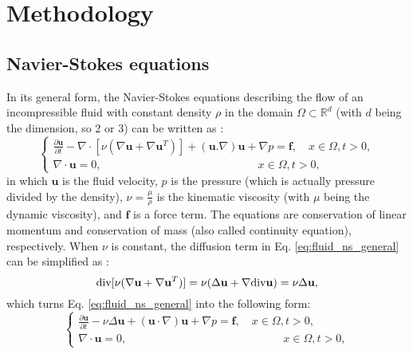 \section{Methodology}

\subsection{Navier-Stokes equations}

In its general form, the Navier-Stokes equations describing the flow of an incompressible fluid with constant density $\rho$ in the domain $\Omega \subset \mathbb{R}^{d}$ (with $d$ being the dimension, so 2 or 3) can be written as \cite{Chung2014}:
\begin{equation} \label{eq:fluid_ns_general}
\left\{ {\begin{array}{*{20}{l}}
\displaystyle  {\frac{{\partial {\mathbf{u}}}}{{\partial t}} - {\nabla\cdot}[\nu(\nabla {\mathbf{u}} + \nabla {{\mathbf{u}}^T})] + ({\mathbf{u}}.\nabla ){\mathbf{u}} + \nabla p = {\mathbf{f}},\quad x \in \Omega ,t > 0,} \\
\displaystyle  {\nabla\cdot{\mathbf{u}} = 0,\quad \quad \quad \quad \quad \quad \quad \quad \quad \quad \quad \quad \quad \quad x \in \Omega ,t > 0,}
\end{array}} \right.
\end{equation}
in which $\mathbf{u}$ is the fluid velocity, $p$ is the pressure (which is actually pressure divided by the density), $\nu = \frac{\mu}{\rho}$ is the kinematic viscosity (with $\mu$ being the dynamic viscosity), and
$\mathbf{f}$ is a force term. The equations are conservation of linear momentum and conservation of mass (also called continuity equation), respectively. When $\nu$ is constant, the diffusion term in Eq. \ref{eq:fluid_ns_general} can be simplified as \cite{Quarteroni2014}:
\begin{equation}
\text{div} [\nu(\nabla {\bf u}+\nabla {\bf u}^{T})] =\nu (\Delta {\bf u} + \nabla \text{div} {\bf u})=\nu \Delta {\bf u},
\end{equation}
which turns Eq. \ref{eq:fluid_ns_general} into the following form:
\begin{equation}  \label{eq:fluid_ns}
\left\{ {\begin{array}{*{20}{l}}
\displaystyle  {\frac{{\partial {\mathbf{u}}}}{{\partial t}} - \nu\Delta{\mathbf{u}} + \left( {{\mathbf{u}} \cdot \nabla } \right) {\mathbf{u}} + \nabla p = {\mathbf{f}},\quad x \in \Omega ,t > 0,} \\
 \displaystyle {\nabla\cdot{\mathbf{u}} = 0,\quad \quad \quad \quad \quad \quad \quad \quad \quad \quad \quad \quad \quad \quad x \in \Omega ,t > 0,}
\end{array}} \right.
\end{equation}

